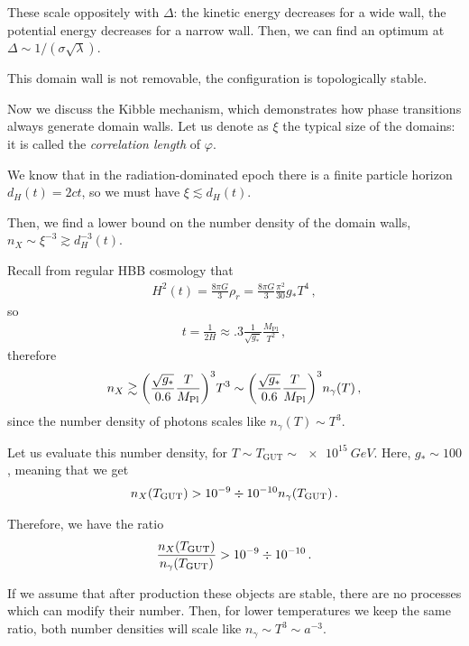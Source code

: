 \documentclass[main.tex]{subfiles}
\begin{document}

These scale oppositely with \(\Delta \): the kinetic energy decreases for a wide wall, the potential energy decreases for a narrow wall. 
Then, we can find an optimum at \(\Delta \sim 1 / (\sigma \sqrt{\lambda })\). 

This domain wall is not removable, the configuration is topologically stable. 

Now we discuss the Kibble mechanism, which demonstrates how phase transitions always generate domain walls. 
Let us denote as \(\xi \) the typical size of the domains: it is called the \emph{correlation length} of \(\varphi \). 

We know that in the radiation-dominated epoch there is a finite particle horizon \(d_H(t) = 2 ct\), so we must have \(\xi \lesssim d_H (t)\). 

Then, we find a lower bound on the number density of the domain walls, \(n_X \sim \xi^{-3} \gtrsim d_H^{-3}(t)\). 

Recall from regular HBB cosmology that 
%
\begin{align}
H^2(t) = \frac{8 \pi G}{3} \rho _r = \frac{8 \pi G}{3} \frac{\pi^2}{30} g_* T^{4}
\,,
\end{align}
%
so 
%
\begin{align}
t = \frac{1}{2 H} \approx \num{.3} \frac{1}{\sqrt{g_*}} \frac{M _{\text{Pl}}}{T^2}
\,,
\end{align}
%
therefore 
%
\begin{align}
n_X \gtrsim \qty(\frac{\sqrt{g_*}}{\num{.6}} \frac{T}{M _{\text{Pl}}})^3 T^3 \sim \qty(\frac{\sqrt{g_*}}{\num{.6}} \frac{T}{ M _{\text{Pl}}})^3 n_\gamma (T)
\,,
\end{align}
%
since the number density of photons scales like \(n_\gamma (T) \sim T^3\).

Let us evaluate this number density, for \(T \sim T _{\text{GUT}} \sim \SI{e15}{GeV}\).
Here, \(g_* \sim 100\), meaning that we get 
%
\begin{align}
n_X (T _{\text{GUT}}) > \num{e-9} \divisionsymbol \num{e-10} n_\gamma (T _{\text{GUT}})
\,.
\end{align}

Therefore, we have the ratio 
%
\begin{align}
\frac{n_X (T _{\text{GUT}})}{n_\gamma (T _{\text{GUT}})} > \num{e-9} \divisionsymbol \num{e-10}
\,.
\end{align}

If we assume that after production these objects are stable, there are no processes which can modify their number. Then, for lower temperatures we keep the same ratio, both number densities will scale like \(n_\gamma \sim T^3 \sim a^{-3}\). 
\end{document}
